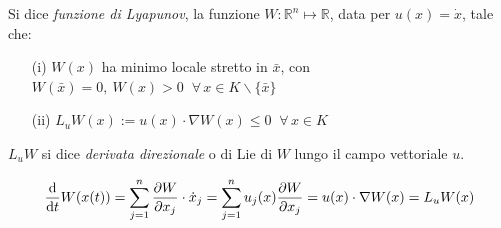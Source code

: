 \begin{definition}
    Si dice \textit{funzione di Lyapunov}, la funzione $W: \mathbb{R}^n\mapsto \mathbb{R}$, data per $u(x)= \dot{x}$, tale che:
    \begin{itemize}
        \item[(i)]$W(x)$ ha minimo locale stretto in $\bar{x}$, con $W(\bar{x})=0, \ W(x)>0 \;\;\forall\, x \in K\backslash\{\bar{x}\}$
        \item[(ii)] $L_uW(x):=u(x)\cdot\nabla W(x)\leq 0 \;\;\forall\,x \in K$
    \end{itemize} 
    $L_uW$ si dice \textit{derivata direzionale} o di Lie di $W$ lungo il campo vettoriale $u$.
\end{definition}
\begin{remark}
    \begin{equation}
        \dv{t}W(x(t))= \sum_{j=1}^{n }\pdv{W}{x_j}\cdot\dot{x}_j= \sum_{j=1}^{n}u_j(x)\pdv{W}{x_j}= u(x)\cdot \nabla W(x)= L_uW(x)
    \end{equation}
\end{remark}


